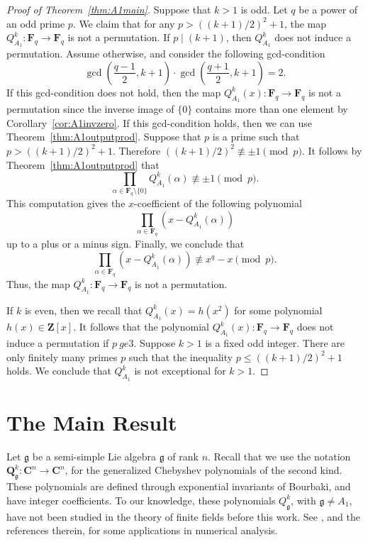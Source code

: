 \documentclass{amsart}
\newcommand{\mf}{\mathfrak}
\newcommand{\C}{\mathbf C}
\newcommand{\Q}{\mathbf Q}
\newcommand{\Z}{\mathbf Z}
\newcommand{\F}{\mathbf F}
\numberwithin{equation}{section}
\theoremstyle{plain}
\theoremstyle{definition}
\begin{document}
\begin{proof}[Proof of Theorem~\ref{thm:A1main}]
Suppose that $k>1$ is odd. Let $q$ be a power of an odd prime $p$. We claim that for any $p>((k+1)/2)^2+1$, the map $Q^k_{A_1}:\F_q\rightarrow\F_q$ is not a permutation. If $p\mid (k+1)$, then $Q_{A_1}^k$ does not induce a permutation. Assume otherwise, and consider the following gcd-condition
$$\gcd\left(\frac{q-1}{2}, k+1\right) \cdot \gcd\left(\frac{q+1}{2}, k+1\right) = 2.$$
If this gcd-condition does not hold, then the map $Q^k_{A_1}(x):\F_q \rightarrow \F_q$ is not a permutation since the inverse image of $\{0\}$ contains more than one element by Corollary~\ref{cor:A1invzero}. If this gcd-condition holds, then we can use Theorem~\ref{thm:A1outputprod}. Suppose that $p$ is a prime such that $p>((k+1)/2)^2+1$. Therefore
$((k+1)/2)^2\not\equiv \pm 1\pmod{p}.$
It follows by Theorem~\ref{thm:A1outputprod} that
$$\prod\limits_{\alpha\in\F_q\setminus\{0\}} Q_{A_{1}}^{k}(\alpha)\not\equiv \pm 1 \pmod{p}.$$
This computation gives the $x$-coefficient of the following polynomial
$$\prod\limits_{\alpha\in\F_q}\left(x-Q_{A_{1}}^{k}(\alpha)\right)$$
up to a plus or a minus sign. Finally, we conclude that 
$$\prod\limits_{\alpha\in\F_q} \left(x-Q_{A_{1}}^{k}(\alpha) \right)\not\equiv x^q-x\pmod p.$$
Thus, the map $Q^k_{A_1}:\F_q\rightarrow\F_q$ is not a permutation.

If $k$ is even, then we recall that $Q^k_{A_1}(x) = h(x^2)$ for some polynomial $h(x)\in\Z[x]$. It follows that the polynomial $Q^k_{A_1}(x):\F_q \rightarrow \F_q$ does not induce a permutation if $p\ ge 3$. Suppose $k>1$ is a fixed odd integer. There are only finitely many primes $p$ such that the inequality $p \leq ((k+1)/2)^2+1$ holds. We conclude that $Q_{A_1}^k$ is not exceptional for $k>1$.
\end{proof}





\section{The Main Result}
Let $\mf{g}$ be a semi-simple Lie algebra $\mf{g}$ of rank $n$. Recall that we use the notation $\Q_{\mf{g}}^k:\C^n \rightarrow \C^n$, for the generalized Chebyshev polynomials of the second kind. These polynomials are defined through exponential invariants of Bourbaki, and have integer coefficients. To our knowledge, these polynomials $Q^k_{\mf{g}}$, with $\mf{g}\neq A_1$, have not been studied in the theory of finite fields before this work. See \cite{hubertsinger2022}, and the references therein, for some applications in numerical analysis.
\end{document}
